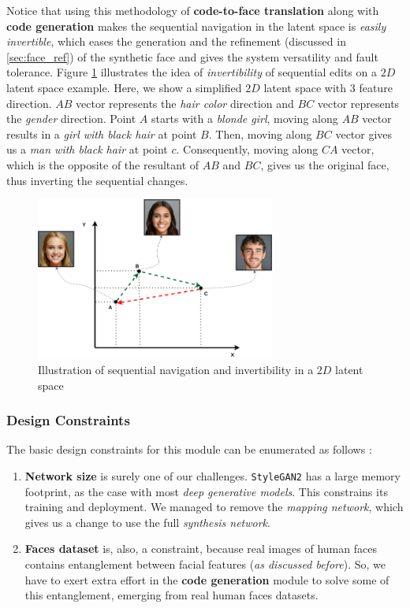 Notice that using this methodology of \textbf{code-to-face translation} along with \textbf{code generation} makes the sequential navigation in the latent space is \emph{easily invertible}, which eases the generation and the refinement (discussed in \ref{sec:face_ref}) of the synthetic face and gives the system versatility and fault tolerance. Figure \ref{fig:latent_nav} illustrates the idea of \emph{invertibility} of sequential edits on a $2D$ latent space example. Here, we show a simplified $2D$ latent space with $3$ feature direction. $AB$ vector represents the \emph{hair color} direction and $BC$ vector represents the \emph{gender} direction. Point $A$ starts with a \emph{blonde girl}, moving along $AB$ vector results in a \emph{girl with black hair} at point $B$. Then, moving along $BC$ vector gives us a \emph{man with black hair} at point $c$. Consequently, moving along $CA$ vector, which is the opposite of the resultant of $AB$ and $BC$, gives us the original face, thus inverting the sequential changes.

\begin{figure}[H]
    \centering
    \includegraphics[width=0.7\textwidth]{images/latent-nav.png}
    \caption{Illustration of sequential navigation and invertibility in a $2D$ latent space}
    \label{fig:latent_nav}
\end{figure}

\subsubsection{Design Constraints}

The basic design constraints for this module can be enumerated as follows :

\begin{enumerate}
    \item \textbf{Network size} is surely one of our challenges. \texttt{StyleGAN2} has a large memory footprint, as the case with most \emph{deep generative models}. This constrains its training and deployment. We managed to remove the \emph{mapping network}, which gives us a change to use the full \emph{synthesis network}.
    \item \textbf{Faces dataset} is, also, a constraint, because real images of human faces contains entanglement between facial features (\emph{as discussed before}). So, we have to exert extra effort in the \textbf{code generation} module to solve some of this entanglement, emerging from real human faces datasets.
\end{enumerate}
